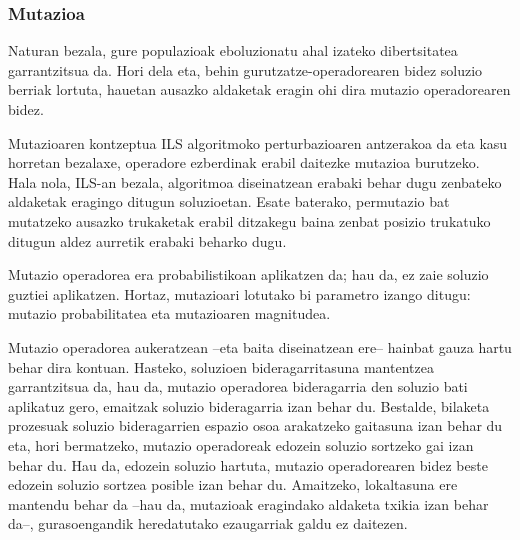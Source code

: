 \documentclass[eu]{ifirak}\usepackage[]{graphicx}\usepackage[]{color}
\begin{document}
\subsubsection{Mutazioa} 

Naturan bezala, gure populazioak eboluzionatu ahal izateko dibertsitatea garrantzitsua da. Hori dela eta, behin gurutzatze-operadorearen bidez soluzio berriak lortuta, hauetan ausazko aldaketak eragin ohi dira mutazio operadorearen bidez. 

Mutazioaren kontzeptua ILS algoritmoko perturbazioaren antzerakoa da eta kasu horretan bezalaxe, operadore ezberdinak erabil daitezke mutazioa burutzeko. Hala nola, ILS-an bezala, algoritmoa diseinatzean erabaki behar dugu zenbateko aldaketak eragingo ditugun soluzioetan. Esate baterako, permutazio bat mutatzeko ausazko trukaketak erabil ditzakegu baina zenbat posizio trukatuko ditugun aldez aurretik erabaki beharko dugu.

Mutazio operadorea era probabilistikoan aplikatzen da; hau da, ez zaie soluzio guztiei aplikatzen. Hortaz, mutazioari lotutako bi parametro izango ditugu: mutazio probabilitatea eta mutazioaren magnitudea.

Mutazio operadorea aukeratzean --eta baita diseinatzean ere-- hainbat gauza hartu behar dira kontuan. Hasteko, soluzioen bideragarritasuna mantentzea garrantzitsua da, hau da, mutazio operadorea bideragarria den soluzio bati aplikatuz gero, emaitzak soluzio bideragarria izan behar du. Bestalde, bilaketa prozesuak soluzio bideragarrien espazio osoa arakatzeko gaitasuna izan behar du eta, hori bermatzeko, mutazio operadoreak edozein soluzio sortzeko gai izan behar du. Hau da, edozein soluzio hartuta, mutazio operadorearen bidez beste edozein soluzio sortzea posible izan behar du. Amaitzeko, lokaltasuna ere mantendu behar da --hau da, mutazioak eragindako aldaketa txikia izan behar da--, gurasoengandik heredatutako ezaugarriak galdu ez daitezen.
\end{document}
